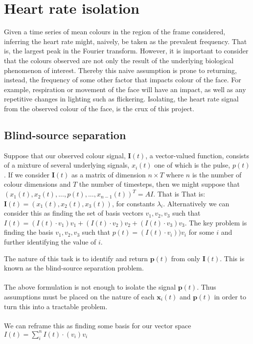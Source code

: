 \section{Heart rate isolation}
Given a time series of mean colours in the region of the frame considered, inferring the heart rate might, naively, be taken as the prevalent frequency. That is, the largest peak in the Fourier transform. However, it is important to consider that the colours observed are not only the result of the underlying biological phenomenon of interest. Thereby this naive assumption is prone to returning, instead, the frequency of some other factor that impacts colour of the face. For example, respiration or movement of the face will have an impact, as well as any repetitive changes in lighting such as flickering. Isolating, the heart rate signal from the observed colour of the face, is the crux of this project. 

\subsection{Blind-source separation}
Suppose that our observed colour signal, $\mathbf{I}(t)$, a vector-valued function, consists of a mixture of several underlying signals, $x_i(t)$ one of which is the pulse, $p(t)$. If we consider $\mathbf{I}(t)$ as a matrix of dimension $n \times T$ where $n$ is the number of colour dimensions and $T$ the number of timesteps, then we might suppose that $ (x_1(t), x_2(t), ..., p(t), ..., x_{n-1}(t))^T = AI$. That is 
That is: $\mathbf{I}(t) = (x_1(t), x_2(t), x_3(t))$, for constants $\lambda_i$. 
Alternatively we can consider this as finding the set of basis vectors $v_1, v_2, v_3$ such that $I(t) = (I(t)\cdot v_1)v_1 + (I(t) \cdot v_2)v_2 + (I(t) \cdot v_3)v_3$. The key problem is finding the basis $v_1, v_2, v_3$ such that $p(t) = (I(t)\cdot v_i))v_i$ for some $i$ and further identifying the value of $i$.

The nature of this task is to identify and return $\mathbf{p}(t)$ from only $\mathbf{I}(t)$. This is known as the blind-source separation problem. 
\\ \\
The above formulation is not enough to isolate the signal $\mathbf{p}(t)$. Thus assumptions must be placed on the nature of each $\mathbf{x}_i(t)$ and $\mathbf{p}(t)$ in order to turn this into a tractable problem. 
\\ \\ 
We can reframe this as finding some basis for our vector space $I(t) = \sum_{i}^{n}I(t)\cdot(v_i)v_i$

